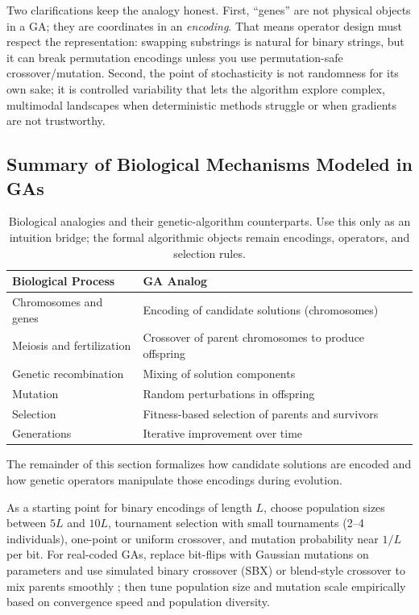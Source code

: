 Two clarifications keep the analogy honest. First, ``genes'' are not physical objects in a GA; they are coordinates in an \emph{encoding}. That means operator design must respect the representation: swapping substrings is natural for binary strings, but it can break permutation encodings unless you use permutation-safe crossover/mutation. Second, the point of stochasticity is not randomness for its own sake; it is controlled variability that lets the algorithm explore complex, multimodal landscapes when deterministic methods struggle or when gradients are not trustworthy.

\subsection{Summary of Biological Mechanisms Modeled in GAs}
\label{sec:evo_summary_of_biological_mechanisms_modeled_in_gas}

\begin{table}[h]
\centering
\caption{Biological analogies and their genetic-algorithm counterparts. Use this only as an intuition bridge; the formal algorithmic objects remain encodings, operators, and selection rules.}
\begin{tabularx}{0.86\linewidth}{@{}l >{\raggedright\arraybackslash}X@{}}
\toprule
\textbf{Biological Process} & \textbf{GA Analog} \\
\midrule
Chromosomes and genes & Encoding of candidate solutions (chromosomes) \\
Meiosis and fertilization & Crossover of parent chromosomes to produce offspring \\
Genetic recombination & Mixing of solution components \\
Mutation & Random perturbations in offspring \\
Selection & Fitness-based selection of parents and survivors \\
Generations & Iterative improvement over time \\
\bottomrule
\end{tabularx}
\end{table}

The remainder of this section formalizes how candidate solutions are encoded and how genetic operators manipulate those encodings during evolution.

\begin{tcolorbox}[summarybox, title={GA hyperparameters at a glance}]
As a starting point for binary encodings of length \(L\), choose population sizes between \(5L\) and \(10L\), tournament selection with small tournaments (2--4 individuals), one-point or uniform crossover, and mutation probability near \(1/L\) per bit. For real-coded GAs, replace bit-flips with Gaussian mutations on parameters and use simulated binary crossover (SBX) or blend-style crossover to mix parents smoothly \citep{DebAgrawal1995}; then tune population size and mutation scale empirically based on convergence speed and population diversity.
\end{tcolorbox}


